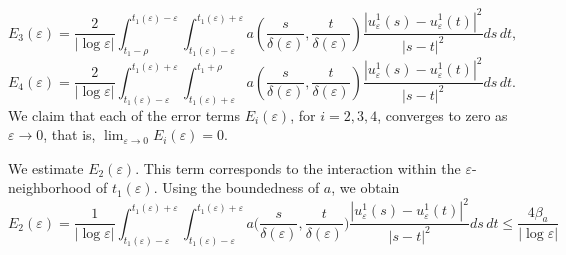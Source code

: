\documentclass[12pt]{article}
\numberwithin{equation}{section}
\begin{document}
\begin{equation*}
     E_{3}(\varepsilon)=\frac{2}{|\log\varepsilon|}\int_{t_{1}-\rho}^{t_{1}(\varepsilon)-\varepsilon}\int_{t_{1}(\varepsilon)-\varepsilon}^{t_{1}(\varepsilon)+\varepsilon}a\left(\frac{s}{\delta(\varepsilon)},\frac{t}{\delta(\varepsilon)}\right)\frac{\left|u^{1}_{\varepsilon}(s)-u^{1}_{\varepsilon}(t)\right|^2}{\left|s-t\right|^2}ds\,dt,
\end{equation*}
\begin{equation*}
     E_{4}(\varepsilon)=\frac{2}{|\log\varepsilon|}\int_{t_{1}(\varepsilon)-\varepsilon}^{t_{1}(\varepsilon)+\varepsilon}\int_{t_{1}(\varepsilon)+\varepsilon}^{t_{1}+\rho}a\left(\frac{s}{\delta(\varepsilon)},\frac{t}{\delta(\varepsilon)}\right)\frac{\left|u^{1}_{\varepsilon}(s)-u^{1}_{\varepsilon}(t)\right|^2}{\left|s-t\right|^2}ds\,dt.
\end{equation*}
We claim that each of the error terms $E_i(\varepsilon)$, for $i=2,3,4$, converges to zero as $\varepsilon \to 0$, that is, $\lim_{\varepsilon \to 0} E_i(\varepsilon) = 0$. 

We estimate $ E_{2}(\varepsilon)$. This term corresponds to the interaction within the $\varepsilon$-neighborhood of $t_1(\varepsilon)$. Using the boundedness of $a$, we obtain
\begin{equation*}
    E_{2}(\varepsilon)=\frac{1}{|\log\varepsilon|}\int_{t_{1}(\varepsilon)-\varepsilon}^{t_{1}(\varepsilon)+\varepsilon}\int_{t_{1}(\varepsilon)-\varepsilon}^{t_{1}(\varepsilon)+\varepsilon}a\Big(\frac{s}{\delta(\varepsilon)},\frac{t}{\delta(\varepsilon)}\Big)\frac{\left|u^{1}_{\varepsilon}(s)-u^{1}_{\varepsilon}(t)\right|^2}{\left|s-t\right|^2}ds\,dt\leq\frac{4\beta_{a}}{|\log\varepsilon|}
\end{equation*}
\end{document}
